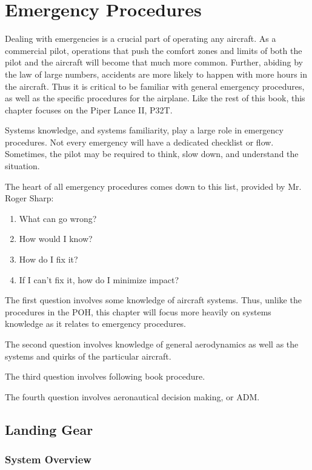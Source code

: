 \chapter{Emergency Procedures}

Dealing with emergencies is a crucial part of operating any aircraft. As a commercial pilot, operations that push the comfort zones and limits of both the pilot and the aircraft will become that much more common. Further, abiding by the law of large numbers, accidents are more likely to happen with more hours in the aircraft. Thus it is critical to be familiar with general emergency procedures, as well as the specific procedures for the airplane. Like the rest of this book, this chapter focuses on the Piper Lance II, P32T.

Systems knowledge, and systems familiarity, play a large role in emergency procedures. Not every emergency will have a dedicated checklist or flow. Sometimes, the pilot may be required to think, slow down, and understand the situation.

The heart of all emergency procedures comes down to this list, provided by Mr. Roger Sharp:

\begin{enumerate}
\item What can go wrong?
\item How would I know?
\item How do I fix it?
\item If I can't fix it, how do I minimize impact?
\end{enumerate}

The first question involves some knowledge of aircraft systems. Thus, unlike the procedures in the POH, this chapter will focus more heavily on systems knowledge as it relates to emergency procedures.

The second question involves knowledge of general aerodynamics as well as the systems and quirks of the particular aircraft.

The third question involves following book procedure.

The fourth question involves aeronautical decision making, or ADM.

\section{Landing Gear}

\subsection{System Overview}

